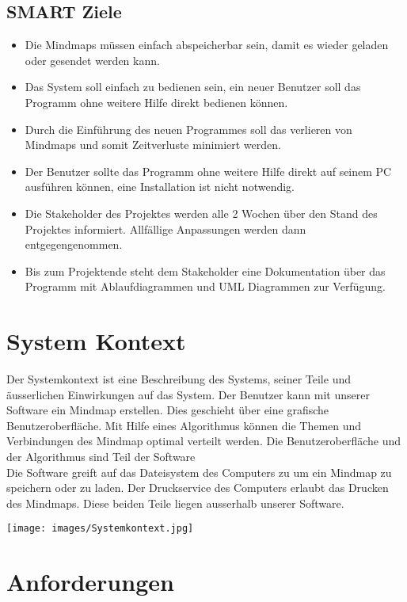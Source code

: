 \documentclass[a4paper,parskip]{scrartcl}
\begin{document}
\subsection{SMART Ziele}
\begin{itemize}
\item Die Mindmaps müssen einfach abspeicherbar sein, damit es wieder geladen oder gesendet werden kann. 
\item Das System soll einfach zu bedienen sein, ein neuer Benutzer soll das Programm ohne weitere Hilfe
direkt bedienen können.
\item Durch die Einführung des neuen Programmes soll das verlieren von Mindmaps und somit Zeitverluste
minimiert werden. 
\item Der Benutzer sollte das Programm ohne weitere Hilfe direkt auf seinem PC ausführen können, eine Installation ist nicht notwendig.
\item Die Stakeholder des Projektes werden alle 2 Wochen über den Stand des Projektes informiert. Allfällige Anpassungen werden dann entgegengenommen.
\item Bis zum Projektende steht dem Stakeholder eine Dokumentation über das Programm mit Ablaufdiagrammen und UML Diagrammen zur Verfügung.

\end{itemize}
\newpage


\section{System Kontext}
Der Systemkontext ist eine Beschreibung des Systems, seiner Teile und äusserlichen Einwirkungen auf das System.
Der Benutzer kann mit unserer Software ein Mindmap erstellen. Dies geschieht über eine grafische Benutzeroberfläche. Mit Hilfe eines Algorithmus können die Themen und Verbindungen des Mindmap optimal verteilt werden. Die Benutzeroberfläche und der Algorithmus sind Teil der Software\\
Die Software greift auf das Dateisystem des Computers zu um ein Mindmap zu speichern oder zu laden.
Der Druckservice des Computers erlaubt das Drucken des Mindmaps. Diese beiden Teile liegen ausserhalb unserer Software.

\texttt{[image: images/Systemkontext.jpg]}

\newpage

\section{Anforderungen}
\end{document}
